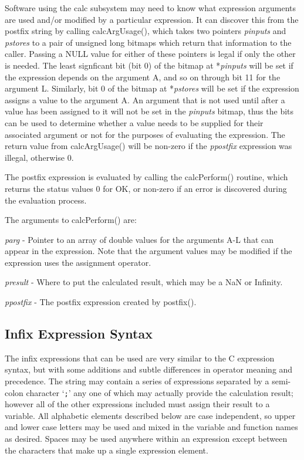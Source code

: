 Software using the calc subsystem may need to know what expression arguments are used and/or modified by a particular expression.
It can discover this from the postfix string by calling calcArgUsage(), which takes two pointers \emph{pinputs} and \emph{pstores} to a pair of unsigned long bitmaps which return that information to the caller.
Passing a NULL value for either of these pointers is legal if only the other is needed.
The least signficant bit (bit 0) of the bitmap at *\emph{pinputs} will be set if the expression depends on the argument A, and so on through bit 11 for the argument L.
Similarly, bit 0 of the bitmap at *\emph{pstores} will be set if the expression assigns a value to the argument A.
An argument that is not used until after a value has been assigned to it will not be set in the \emph{pinputs} bitmap, thus the bits can be used to determine whether a value needs to be supplied for their associated argument or not for the purposes of evaluating the expression.
The return value from calcArgUsage() will be non-zero if the \emph{ppostfix} expression was illegal, otherwise 0.

The postfix expression is evaluated by calling the calcPerform() routine, which returns the status values 0 for OK, or non-zero if an error is discovered during the evaluation process.

The arguments to calcPerform() are:

\begin{description}
\item \emph{parg} - Pointer to an array of double values for the arguments A-L that can appear in the expression.
Note that the argument values may be modified if the expression uses the assignment operator.

\item \emph{presult} - Where to put the calculated result, which may be a NaN or Infinity.

\item \emph{ppostfix} - The postfix expression created by postfix().

\end{description}

\subsection{Infix Expression Syntax}

The infix expressions that can be used are very similar to the C expression syntax, but with some additions and subtle differences in operator meaning and precedence.
The string may contain a series of expressions separated by a semi-colon character `\verb|;|' any one of which may actually provide the calculation result;
however all of the other expressions included must assign their result to a variable.
All alphabetic elements described below are case independent, so upper and lower case letters may be used and mixed in the variable and function names as desired.
Spaces may be used anywhere within an expression except between the characters that make up a single expression element.


